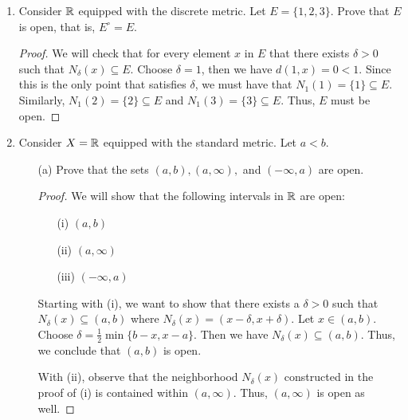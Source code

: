 \documentclass[a4paper]{article}
\begin{document}
\begin{enumerate}
\begin{proof}
        For (ii), note that the complement of \( \emptyset \) is just \( X  \) itself. Since \( X  \) is open by problem 4, we see that \( X^{c} = \emptyset \) must be closed.
        \end{proof}
    \item Consider \( \mathbb{R}  \) equipped with the discrete metric. Let \( E = \{ 1,2,3 \} \). Prove that \( E  \) is open, that is, \( E^{\circ} = E  \).
        \begin{proof}
        We will check that for every element \( x  \) in \( E  \) that there exists \( \delta > 0  \) such that \( {N}_{\delta}(x) \subseteq E  \). Choose \( \delta = 1  \), then we have \( d(1,x) = 0 < 1   \). Since this is the only point that satisfies \( \delta \), we must have that \( {N}_{1}(1) = \{ 1 \} \subseteq E   \). Similarly, \( {N}_{1}(2) = \{ 2 \}  \subseteq  E  \) and \( {N}_{1}(3) = \{ 3 \}  \subseteq E  \). Thus, \( E  \) must be open.
        \end{proof}
    \item Consider \( X = \mathbb{R}  \) equipped with the standard metric. Let \( a < b  \). 
        \begin{enumerate}
            \item[(a)] Prove that the sets \( (a,b), (a,\infty ),  \) and \( (-\infty , a) \) are open.
                \begin{proof}
                We will show that the following intervals in \( \mathbb{R}  \) are open:                
                \begin{enumerate}
                    \item[(i)] \( (a,b) \)
                    \item[(ii)] \( (a,\infty ) \)
                    \item[(iii)] \( (-\infty , a) \)
                \end{enumerate}
                Starting with (i), we want to show that there exists a \( \delta > 0  \) such that \( {N}_{\delta}(x) \subseteq (a,b) \) where \( {N}_{\delta}(x) = (x - \delta, x + \delta) \). Let \( x \in (a,b) \). Choose \( \delta = \frac{ 1 }{ 2 } \min \{ b - x, x - a  \}  \). Then we have \( {N}_{\delta}(x) \subseteq (a,b)  \). Thus, we conclude that \( (a,b) \) is open.

                With (ii), observe that the neighborhood \( {N}_{\delta}(x) \) constructed in the proof of (i) is contained within \( (a,\infty ) \). Thus, \( (a,\infty ) \) is open as well. 


\end{proof}
\end{enumerate}
\end{enumerate}
\end{document}
